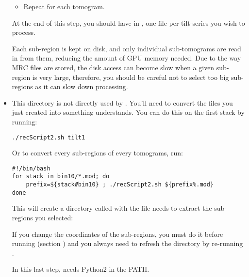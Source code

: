 \begin{itemize}
\begin{itemize}
        \item Repeat for each tomogram.
        
    \end{itemize}
    At the end of this step, you should have in , one  file per tilt-series you wish to process.

    \begin{note}Each sub-region is kept on disk, and only individual sub-tomograms are read in from them, reducing the amount of GPU memory needed. Due to the way MRC files are stored, the disk access can become slow when a given sub-region is very large, therefore, you should be careful not to select too big sub-regions as it can slow down processing. 
    \end{note}

    \item This  directory is not directly used by {\emClarity}. You'll need to convert the  files you just created into something {\emClarity} understands. You can do this on the first stack by running:
\begin{lstlisting}
./recScript2.sh tilt1
\end{lstlisting}
    Or to convert every sub-regions of every tomograms, run:
\begin{lstlisting}
#!/bin/bash
for stack in bin10/*.mod; do
    prefix=${stack#bin10} ; ./recScript2.sh ${prefix%.mod}
done
\end{lstlisting}

    This will create a directory called  with the file {\emClarity} needs to extract the sub-regions you selected:
    

    \begin{note}If you change the coordinates of the sub-regions, you must do it before running  (section ) and you always need to refresh the  directory by re-running .
    \end{note}
    
    \begin{note}In this last step,  needs Python2 in the PATH.
    \end{note}
\end{itemize}

